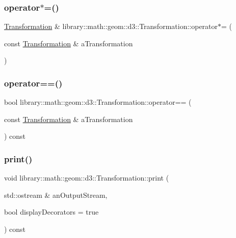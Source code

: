 \subsubsection{\texorpdfstring{operator$\ast$=()}{operator*=()}}
{\footnotesize\ttfamily \hyperlink{classlibrary_1_1math_1_1geom_1_1d3_1_1_transformation}{Transformation} \& library\+::math\+::geom\+::d3\+::\+Transformation\+::operator$\ast$= (\begin{DoxyParamCaption}\item[{const \hyperlink{classlibrary_1_1math_1_1geom_1_1d3_1_1_transformation}{Transformation} \&}]{a\+Transformation }\end{DoxyParamCaption})}

\mbox{\label{classlibrary_1_1math_1_1geom_1_1d3_1_1_transformation_ad65ef7737c9299ae939585873a147800}} 
\subsubsection{\texorpdfstring{operator==()}{operator==()}}
{\footnotesize\ttfamily bool library\+::math\+::geom\+::d3\+::\+Transformation\+::operator== (\begin{DoxyParamCaption}\item[{const \hyperlink{classlibrary_1_1math_1_1geom_1_1d3_1_1_transformation}{Transformation} \&}]{a\+Transformation }\end{DoxyParamCaption}) const}

\mbox{\label{classlibrary_1_1math_1_1geom_1_1d3_1_1_transformation_a0cafbc8affb176f6774af01b98536e69}} 
\subsubsection{\texorpdfstring{print()}{print()}}
{\footnotesize\ttfamily void library\+::math\+::geom\+::d3\+::\+Transformation\+::print (\begin{DoxyParamCaption}\item[{std\+::ostream \&}]{an\+Output\+Stream,  }\item[{bool}]{display\+Decorators = {\ttfamily true} }\end{DoxyParamCaption}) const\hspace{0.3cm}{\ttfamily [virtual]}}



